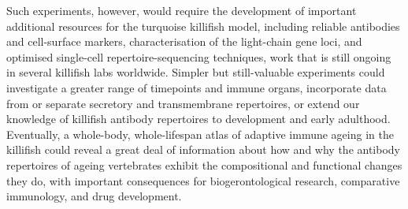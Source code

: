 Such experiments, however, would require the development of important additional resources for the turquoise killifish model, including reliable antibodies and cell-surface markers, characterisation of the light-chain gene loci, and optimised single-cell repertoire-sequencing techniques, work that is still ongoing in several killifish labs worldwide. Simpler but still-valuable experiments could investigate a greater range of timepoints and immune organs, incorporate data from  or separate secretory and transmembrane  repertoires, or extend our knowledge of killifish antibody repertoires to development and early adulthood. Eventually, a whole-body, whole-lifespan atlas of adaptive immune ageing in the killifish could reveal a great deal of information about how and why the antibody repertoires of ageing vertebrates exhibit the compositional and functional changes they do, with important consequences for biogerontological research, comparative immunology, and drug development.
